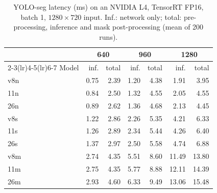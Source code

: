 \begin{table}[t]
\centering\small\setlength{\tabcolsep}{3.5pt}
\caption{YOLO-seg latency (ms) on an NVIDIA L4, TensorRT FP16, batch 1, $1280\times720$ input. Inf.: network only; total: pre-processing, inference and mask post-processing (mean of 200 runs).}
\label{tab:latency-l4}
\begin{tabular}{lrrrrrr}
\toprule
 & \multicolumn{2}{c}{640} & \multicolumn{2}{c}{960} & \multicolumn{2}{c}{1280} \\
\cmidrule(lr){2-3}\cmidrule(lr){4-5}\cmidrule(lr){6-7}
Model & inf. & total & inf. & total & inf. & total \\
\midrule
v8n & 0.75 & 2.39 & 1.20 & 4.38 & 1.91 & 3.95 \\
11n & 0.84 & 2.50 & 1.32 & 4.55 & 2.05 & 4.55 \\
26n & 0.89 & 2.62 & 1.36 & 4.68 & 2.13 & 4.45 \\
v8s & 1.22 & 2.86 & 2.26 & 5.35 & 4.21 & 6.33 \\
11s & 1.26 & 2.89 & 2.34 & 5.44 & 4.26 & 6.40 \\
26s & 1.37 & 2.97 & 2.50 & 5.58 & 4.74 & 6.88 \\
v8m & 2.74 & 4.35 & 5.51 & 8.60 & 11.49 & 13.80 \\
11m & 2.75 & 4.35 & 5.77 & 8.88 & 12.11 & 14.39 \\
26m & 2.93 & 4.60 & 6.33 & 9.49 & 13.06 & 15.48 \\
\bottomrule
\end{tabular}
\end{table}
